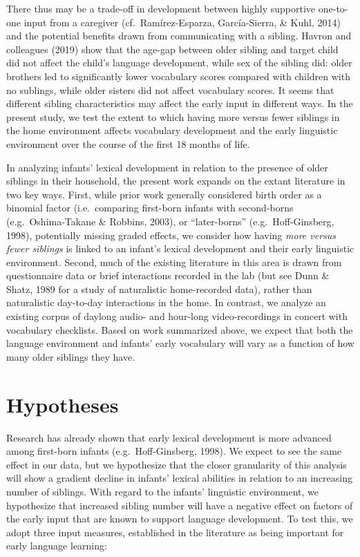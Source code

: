 \documentclass[
  english,
  man,floatsintext]{apa6}
\begin{document}
There thus may be a trade-off in development between highly supportive one-to-one input from a caregiver (cf.~Ramírez-Esparza, García-Sierra, \& Kuhl, 2014) and the potential benefits drawn from communicating with a sibling. Havron and colleagues (2019) show that the age-gap between older sibling and target child did not affect the child's language development, while sex of the sibling did: older brothers led to significantly lower vocabulary scores compared with children with no sublings, while older sisters did not affect vocabulary scores. It seems that different sibling characteristics may affect the early input in different ways. In the present study, we test the extent to which having more versus fewer siblings in the home environment affects vocabulary development and the early linguistic environment over the course of the first 18 months of life.

In analyzing infants' lexical development in relation to the presence of older siblings in their household, the present work expands on the extant literature in two key ways. First, while prior work generally considered birth order as a binomial factor (i.e.~comparing first-born infants with second-borns (e.g.~Oshima-Takane \& Robbins, 2003), or \enquote{later-borns} (e.g.~Hoff-Ginsberg, 1998), potentially missing graded effects, we consider how having \emph{more versus fewer siblings} is linked to an infant's lexical development and their early linguistic environment. Second, much of the existing literature in this area is drawn from questionnaire data or brief interactions recorded in the lab (but see Dunn \& Shatz, 1989 for a study of naturalistic home-recorded data), rather than naturalistic day-to-day interactions in the home. In contrast, we analyze an existing corpus of daylong audio- and hour-long video-recordings in concert with vocabulary checklists. Based on work summarized above, we expect that both the language environment and infants' early vocabulary will vary as a function of how many older siblings they have.

\hypertarget{hypotheses}{%
\section{Hypotheses}\label{hypotheses}}

Research has already shown that early lexical development is more advanced among first-born infants (e.g.~Hoff-Ginsberg, 1998). We expect to see the same effect in our data, but we hypothesize that the closer granularity of this analysis will show a gradient decline in infants' lexical abilities in relation to an increasing number of siblings.
With regard to the infants' linguistic environment, we hypothesize that increased sibling number will have a negative effect on factors of the early input that are known to support language development. To test this, we adopt three input measures, established in the literature as being important for early language learning:
\end{document}
